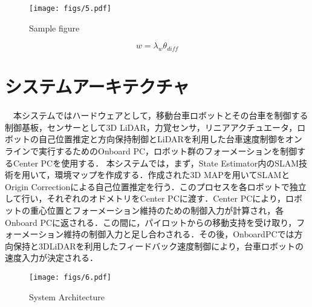 \documentclass[a4jsme]{jsmepaper}
\begin{document}
\begin{figure}[htbp]
  \begin{center}
  \vspace{1zh}
    \texttt{[image: figs/5.pdf]}
  \end{center}
  \caption{Sample figure}
  \label{fig:fig5}
\end{figure}



\begin{equation}
w = \lambda_w \theta_{diff}
\label{eq:direction}
\end{equation}



\section{システムアーキテクチャ}
　本システムではハードウェアとして，移動台車ロボットとその台車を制御する制御基板，センサーとして3D LiDAR，力覚センサ，リニアアクチュエータ，ロボットの自己位置推定と方向保持制御とLiDARを利用した台車速度制御をオンラインで実行するためのOnboard PC，ロボット群のフォーメーションを制御するCenter PCを使用する．
本システムでは，まず，State Estimator内のSLAM技術を用いて，環境マップを作成する．作成された3D MAPを用いてSLAMとOrigin Correctionによる自己位置推定を行う．このプロセスを各ロボットで独立して行い，それぞれのオドメトリをCenter PCに渡す．Center PCにより，ロボットの重心位置とフォーメーション維持のための制御入力が計算され，各Onboard PCに返される．この間に，パイロットからの移動支持を受け取り，フォーメーション維持の制御入力と足し合わされる．その後，OnboardPCでは方向保持と3DLiDARを利用したフィードバック速度制御により，台車ロボットの速度入力が決定される．

\begin{figure}[htbp]
  \begin{center}
  \vspace{1zh}
    \texttt{[image: figs/6.pdf]}
  \end{center}
  \caption{System Architecture}
  \label{fig:fig6}
\end{figure}
\end{document}
